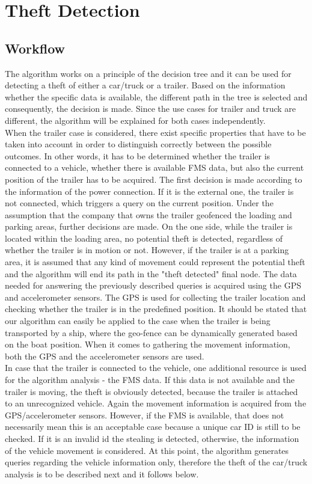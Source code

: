 \chapter{Theft Detection}

\section{Workflow}
The algorithm works on a principle of the decision tree and it can be used for detecting a theft of either a car/truck or a trailer. Based on the information whether the specific data is available, the different path in the tree is selected and consequently, the decision is made. Since the use cases for trailer and truck are different, the algorithm will be explained for both cases independently.\\
When the trailer case is considered, there exist specific properties that have to be taken into account in order to distinguish correctly between the possible outcomes. In other words, it has to be determined whether the trailer is connected to a vehicle, whether there is available FMS data, but also the current position of the trailer has to be acquired. 
The first decision is made according to the information of the power connection. If it is the external one, the trailer is not connected, which triggers a query on the current position. Under the assumption that the company that owns the trailer geofenced the loading and parking areas, further decisions are made. On the one side, while the trailer is located within the loading area, no potential theft is detected, regardless of whether the trailer is in motion or not. However, if the trailer is at a parking area, it is assumed that any kind of movement could represent the potential theft and the algorithm will end its path in the "theft detected" final node. The data needed for answering the previously described queries is acquired using the GPS and accelerometer sensors. The GPS is used for collecting the trailer location and checking whether the trailer is in the predefined position. It should be stated that our algorithm can easily be applied to the case when the trailer is being transported by a ship, where the geo-fence can be dynamically generated based on the boat position. When it comes to gathering the movement information, both the GPS and the accelerometer sensors are used. \\
In case that the trailer is connected to the vehicle, one additional resource is used for the algorithm analysis - the FMS data. If this data is not available and the trailer is moving, the theft is obviously detected, because the trailer is attached to an unrecognized vehicle. Again the movement information is acquired from the GPS/accelerometer sensors. However, if the FMS is available, that does not necessarily mean this is an acceptable case because a unique car ID is still to be checked. If it is an invalid id the stealing is detected, otherwise, the information of the vehicle movement is considered. At this point, the algorithm generates queries regarding the vehicle information only, therefore the theft of the car/truck analysis is to be described next and it follows below.\\


\clearpage